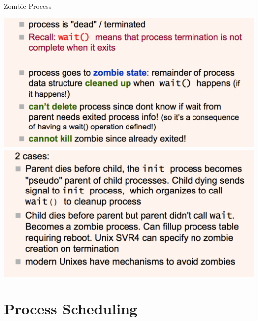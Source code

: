 \documentclass[12pt,a4paper]{article}
\theoremstyle{definition}
\begin{document}
\begin{tcolorbox}
	\textsf{Zombie Process}
	
	\includegraphics[scale=0.30]{m1/zombieProcess1}
	\includegraphics[scale=0.30]{m1/zombieProcess2}
	\centering
\end{tcolorbox}

\section{Process Scheduling}





















\end{document}
